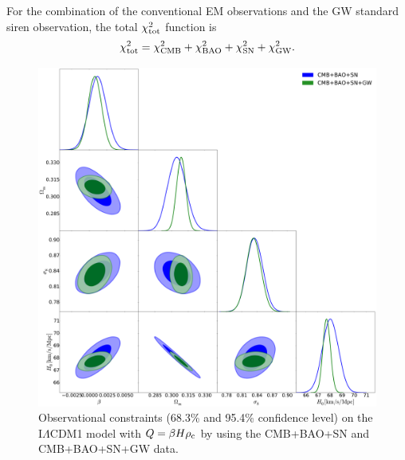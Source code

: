 \documentclass[aps,prd,nofootinbib,amsmath,amssymb,superscriptaddress,twocolumn,10pt]{revtex4}%
\begin{document}
For the combination of the conventional EM observations and the GW standard siren observation, the total $\chi^{2}_{\rm tot}$ function is
\begin{equation}
\chi^{2}_{\rm tot}=\chi^{2}_{\rm CMB}+\chi^{2}_{\rm BAO}+\chi^{2}_{\rm SN}+\chi^{2}_{\rm GW}.
\end{equation}

\begin{figure}[!htp]
\includegraphics[scale=0.19]{ilcdmhpc.pdf}

\centering \caption{\label{fig1} Observational constraints (68.3\% and 95.4\% confidence level) on the I$\Lambda$CDM1 model with $Q=\beta H \rho_{\rm c}$ by using the CMB+BAO+SN and CMB+BAO+SN+GW data.}
\end{figure}
\end{document}
